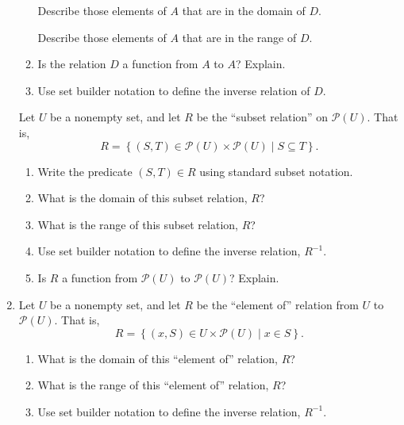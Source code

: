 \begin{enumerate}
\begin{enumerate}
  \yitem Describe those elements of  $A$  that are in the domain of  $D$.

  \yitem Describe those elements of  $A$  that are in the range of  $D$.

  \item Is the relation  $D$  a function from  $A$  to  $A$?  Explain.

  \item Use set builder notation to define the inverse relation of  $D$.
\end{enumerate}

\xitem \label{exer:sec71-4}
Let  $U$  be a nonempty set, and let  $R$  be the ``subset relation'' on  
$\mathcal{P}( U )$.  That is, 
\[
R = \left\{ { {\left( {S, T} \right) \in \mathcal{P}( U ) \times \mathcal{P}( U ) } \mid S \subseteq T} \right\}\!.
\]

\begin{enumerate}
  \item Write the predicate  $\left( {S, T} \right) \in R$ using standard subset notation.

  \item What is the domain of this subset relation, $R$?

  \item What is the range of this subset relation, $R$?

  \item Use set builder notation to define the inverse relation, $R^{ - 1} $.

  \item Is  $R$  a function from  $\mathcal{P}( U )$  to  
        $\mathcal{P}( U )$?  Explain.
\end{enumerate} 

\item Let  $U$  be a nonempty set, and let  $R$  be the ``element of''  relation from  $U$  to   $\mathcal{P}\left( U \right)$.  That is, \label{exer:sec71-5}
\[
R = \left\{ { {\left( {x, S} \right) \in U \times \mathcal{P}( U ) } \mid x \in S} \right\}\!.
\]

\begin{enumerate} 

  \item What is the domain of this ``element of'' relation, $R$?

  \item What is the range of this ``element of'' relation, $R$?

  \item Use set builder notation to define the inverse relation, $R^{ - 1} $.


\end{enumerate}
\end{enumerate}
